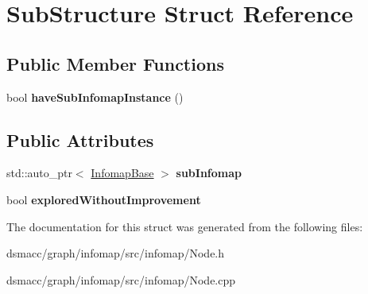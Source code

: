 \hypertarget{structSubStructure}{}\section{Sub\+Structure Struct Reference}
\label{structSubStructure}
\subsection*{Public Member Functions}
\begin{DoxyCompactItemize}
\item 
\mbox{\label{structSubStructure_a79802ab682b5ce02e33a823b66327c4e}} 
bool {\bfseries have\+Sub\+Infomap\+Instance} ()
\end{DoxyCompactItemize}
\subsection*{Public Attributes}
\begin{DoxyCompactItemize}
\item 
\mbox{\label{structSubStructure_a01088cb7532d8a4d5432b58326fa65ac}} 
std\+::auto\+\_\+ptr$<$ \mbox{\hyperlink{classInfomapBase}{Infomap\+Base}} $>$ {\bfseries sub\+Infomap}
\item 
\mbox{\label{structSubStructure_abaaabf2aa1e849fba692185aed180371}} 
bool {\bfseries explored\+Without\+Improvement}
\end{DoxyCompactItemize}


The documentation for this struct was generated from the following files\+:\begin{DoxyCompactItemize}
\item 
dsmacc/graph/infomap/src/infomap/Node.\+h\item 
dsmacc/graph/infomap/src/infomap/Node.\+cpp\end{DoxyCompactItemize}
